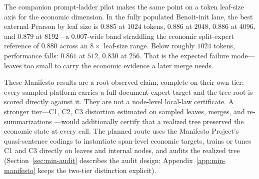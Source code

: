 The companion prompt-ladder pilot makes the same point on a token
leaf-size axis for the economic dimension. In the fully populated
Benoit-init lane, the best external Pearson by leaf size is $0.885$
at $1024$ tokens, $0.886$ at $2048$, $0.886$ at $4096$, and $0.879$
at $8192$---a $0.007$-wide band straddling the economic split-expert
reference of $0.880$ across an $8\times$ leaf-size range. Below
roughly $1024$ tokens, performance falls: $0.861$ at $512$, $0.830$
at $256$. That is the expected failure mode---leaves too small to
carry the economic evidence a later merge needs.

These Manifesto results are a root-observed claim, complete on their
own tier: every sampled platform carries a full-document expert target
and the tree root is scored directly against it. They are not a
node-level local-law certificate. A stronger tier---C1, C2, C3
distortion estimated on sampled leaves, merges, and re-summarizations
---would additionally certify that a realized tree preserved the
economic state at every call. The planned route uses the Manifesto
Project's quasi-sentence codings to instantiate span-level economic
targets, trains or tunes C1 and C3 directly on leaves and internal
nodes, and audits the realized tree
(Section~\ref{sec:min-audit} describes the audit design;
Appendix~\ref{app:min-manifesto} keeps the two-tier distinction
explicit).
